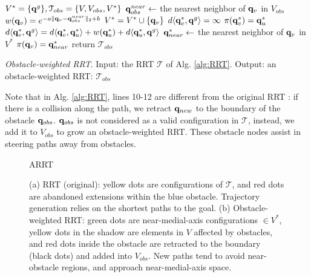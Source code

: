 \begin{algorithm}[h]
	\begin{algorithmic}[1]
		\STATE $  V^* = \{{\bf q}^g\}, \mathcal{T}_{obs} = \{V, V_{obs},V^*\}$
		\STATE ${\bf q}_{obs}^{near} \leftarrow$ the nearest neighbor of ${\bf q}_v$ in $V_{obs}$
		\STATE $w({\bf q}_v) = e^{-a\|{\bf q}_v-{\bf q}_{obs}^{near}\|_2+b}$
		\STATE	$V^* = V^* \cup \{{\bf q}_v\}$
		\ENDIF 
		\ENDFOR
		\STATE $d\langle {\bf q}^*_v, {\bf q}^g\rangle=\infty$
		\STATE $\pi({\bf q}^*_v)={\bf q}^*_{u}$
		\STATE $d\langle {\bf q}^*_v,{\bf q}^g\rangle = d\langle {\bf q}^*_v,{\bf q}^*_{u}\rangle+ w({\bf q}^*_u)+d\langle {\bf q}^*_{u},{\bf q}^g\rangle $
		\ENDIF
		\ENDFOR
		\ENDFOR
		\STATE ${\bf q}^*_{near}\leftarrow$ the nearest neighbor of  ${\bf q}_v$ in $V^*$
		\STATE $\pi({\bf q}_v)={\bf q}^*_{near}$
		\ENDIF
		\ENDFOR
		\STATE return $\mathcal{T}_{obs}$
	\end{algorithmic}
	\caption{\textit {Obstacle-weighted RRT}. Input: the RRT $\mathcal{T}$ of Alg. \ref{alg:RRT}. Output: an obstacle-weighted RRT: $\mathcal{T}_{obs}$ }
	\label{alg:ARRT}
\end{algorithm}

Note that in Alg. \ref{alg:RRT}, lines 10-12 are different from the original RRT \cite{lavalle1998rapidly}: if there is a collision along the path, we retract ${\bf q}_{new}$ to the boundary of the obstacle ${\bf q}_{obs}$. ${\bf q}_{obs}$ is not considered as a valid configuration in $\mathcal{T}$, instead, we add it to $V_{obs}$ to grow an obstacle-weighted RRT. These obstacle nodes assist in  steering paths away from obstacles. 


\begin{figure}[h]
	\vspace{1.5 mm}
	\centering
	\begin{overpic}[width=0.8\columnwidth]{ARRT}
	\end{overpic}
	
	\caption{\label{fig:ARRT} (a) RRT (original): yellow dots are configurations of $\mathcal{T}$, and red dots are abandoned extensions within the blue obstacle. Trajectory generation relies on the shortest paths to the goal. (b) Obstacle-weighted RRT: green dots are near-medial-axis configurations $\in V^*$, yellow dots in the shadow are elements in $V$ affected by obstacles, and red dots inside the obstacle are retracted to the boundary (black dots) and added into $V_{obs}$. New paths tend to avoid near-obstacle regions, and approach near-medial-axis space.}
\end{figure}




